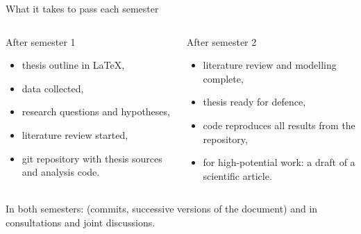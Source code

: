 \documentclass[aspectratio=169,11pt,t]{beamer}
\begin{document}
\begin{frame}{What it takes to pass each semester}
  \begin{columns}[T,onlytextwidth]
    \begin{block}{After semester 1}
      \begin{itemize}
        \item thesis outline in LaTeX,
        \item data collected,
        \item research questions and hypotheses,
        \item literature review started,
        \item git repository with thesis sources and analysis code.
      \end{itemize}
    \end{block}
    \begin{block}{After semester 2}
      \begin{itemize}
        \item literature review and modelling complete,
        \item thesis ready for defence,
        \item code reproduces all results from the repository,
        \item for high-potential work: a draft of a scientific article.
      \end{itemize}
    \end{block}
  \end{columns}

  \bigskip
  In both semesters:  (commits, successive versions of the document)
  and  in consultations and joint discussions.
\end{frame}
\end{document}

